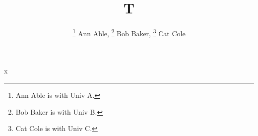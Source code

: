 \documentclass{article}
\begin{document}
\title{T}
\author{
\thanks{Ann Able is with Univ A.} {Ann Able,}
\thanks{Bob Baker is with Univ B.} {Bob Baker,}
\thanks{Cat Cole is with Univ C.} {Cat Cole}
}
\maketitle
x
\end{document}
